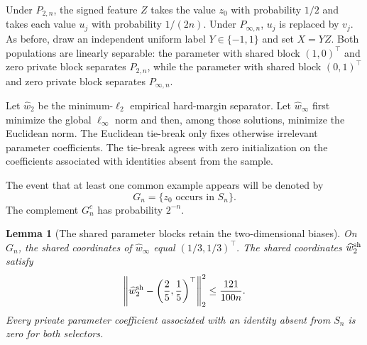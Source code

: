 \documentclass[11pt,twoside]{article}
\newtheorem{lemma}[theorem]{Lemma}
\theoremstyle{definition}
\theoremstyle{remark}
\begin{document}
Under $P_{2,n}$, the signed feature $Z$ takes the value $z_0$ with probability
$1/2$ and takes each value $u_j$ with probability $1/(2n)$. Under $P_{\infty,n}$,
$u_j$ is replaced by $v_j$. As before, draw an independent uniform label
$Y\in\{-1,1\}$ and set $X=YZ$. Both populations are linearly separable:
the parameter with shared block $(1,0)^\top$ and zero private block separates
$P_{2,n}$, while the parameter with shared block $(0,1)^\top$ and zero private
block separates $P_{\infty,n}$.

Let $\widehat w_2$ be the minimum-$\ell_2$ empirical hard-margin separator.
Let $\widehat w_\infty$ first minimize the global $\ell_\infty$ norm and then,
among those solutions, minimize the Euclidean norm. The Euclidean tie-break only
fixes otherwise irrelevant parameter coefficients. The tie-break agrees with
zero initialization on the coefficients associated with identities absent
from the sample.

The event that at least one common example appears will be denoted by
\[
 G_n=\{z_0\text{ occurs in }S_n\}.
\]
The complement $G_n^c$ has probability $2^{-n}$.

\begin{lemma}[The shared parameter blocks retain the two-dimensional biases]
\label{lem:private-shared}
On $G_n$, the shared coordinates of $\widehat w_\infty$ equal
$(1/3,1/3)^\top$. The shared coordinates $\widehat w_2^{\rm sh}$ satisfy
\[
 \left\|\widehat w_2^{\rm sh}
       -\left(\frac25,\frac15\right)^\top\right\|_2^2
 \le \frac{121}{100n}.
\]
Every private parameter coefficient associated with an identity absent from
$S_n$ is zero for both selectors.
\end{lemma}
\end{document}
